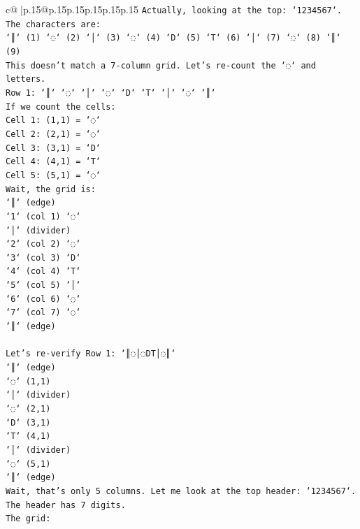 \documentclass{article}
\begin{document}
{\begin{supertabular}{c@{$\;$}|p{.15\linewidth}@{}p{.15\linewidth}p{.15\linewidth}p{.15\linewidth}p{.15\linewidth}p{.15\linewidth}}
{{{\texttt{Actually, looking at the top: `1234567`.} \\
\texttt{The characters are:} \\
\texttt{`║` (1) `◌` (2) `│` (3) `◌` (4) `D` (5) `T` (6) `│` (7) `◌` (8) `║` (9)} \\
\texttt{This doesn't match a 7{-}column grid. Let's re{-}count the `◌` and letters.} \\
\texttt{Row 1: `║` `◌` `│` `◌` `D` `T` `│` `◌` `║`} \\
\texttt{If we count the cells:} \\
\texttt{Cell 1: (1,1) = `◌`} \\
\texttt{Cell 2: (2,1) = `◌`} \\
\texttt{Cell 3: (3,1) = `D`} \\
\texttt{Cell 4: (4,1) = `T`} \\
\texttt{Cell 5: (5,1) = `◌`} \\
\texttt{Wait, the grid is:} \\
\texttt{`║` (edge)} \\
\texttt{`1` (col 1) `◌`} \\
\texttt{`│` (divider)} \\
\texttt{`2` (col 2) `◌`} \\
\texttt{`3` (col 3) `D`} \\
\texttt{`4` (col 4) `T`} \\
\texttt{`5` (col 5) `│`} \\
\texttt{`6` (col 6) `◌`} \\
\texttt{`7` (col 7) `◌`} \\
\texttt{`║` (edge)} \\
\\ 
\texttt{Let's re{-}verify Row 1: `║◌│◌DT│◌║`} \\
\texttt{`║` (edge)} \\
\texttt{`◌` (1,1)} \\
\texttt{`│` (divider)} \\
\texttt{`◌` (2,1)} \\
\texttt{`D` (3,1)} \\
\texttt{`T` (4,1)} \\
\texttt{`│` (divider)} \\
\texttt{`◌` (5,1)} \\
\texttt{`║` (edge)} \\
\texttt{Wait, that's only 5 columns. Let me look at the top header: `1234567`.} \\
\texttt{The header has 7 digits.} \\
\texttt{The grid:} \\
}}}
\end{supertabular}}
\end{document}

